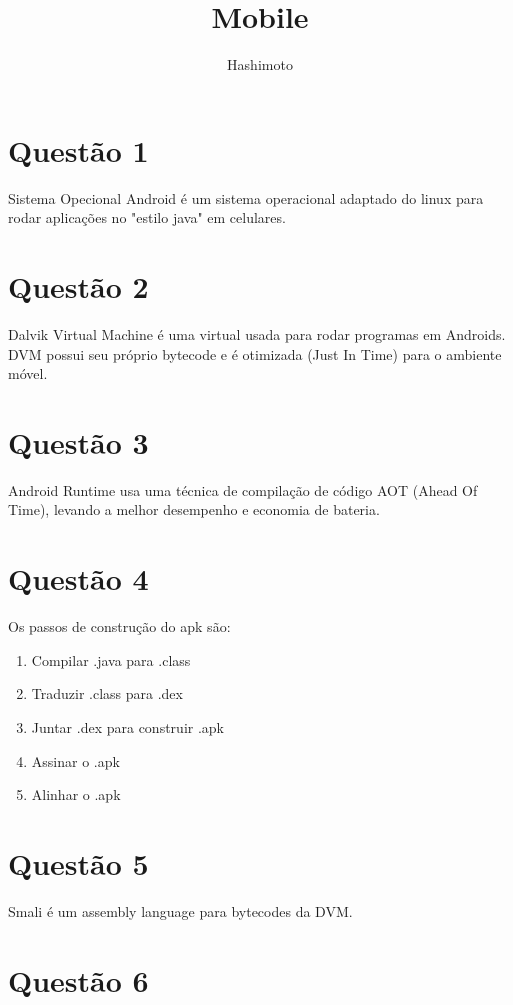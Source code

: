 \documentclass{article}
\begin{document}
\title{Mobile}
\author{Hashimoto}
\date{}
\maketitle

\section*{Questão 1}

Sistema Opecional Android é um sistema operacional adaptado do linux para
rodar aplicações no "estilo java" em celulares.

\section*{Questão 2}

Dalvik Virtual Machine é uma virtual usada para rodar programas em Androids.
DVM possui seu próprio bytecode e é otimizada (Just In Time)
para o ambiente móvel.

\section*{Questão 3}

Android Runtime usa uma técnica de compilação de código AOT (Ahead Of Time),
levando a melhor desempenho e economia de bateria.

\section*{Questão 4}

Os passos de construção do apk são:
\begin{enumerate}
    \item Compilar .java para .class
    \item Traduzir .class para .dex
    \item Juntar .dex para construir .apk
    \item Assinar o .apk
    \item Alinhar o .apk
\end{enumerate}

\section*{Questão 5}

Smali é um assembly language para bytecodes da DVM.

\section*{Questão 6}
\end{document}
